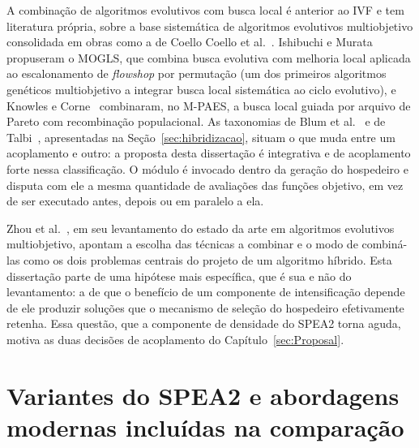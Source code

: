 A combinação de algoritmos evolutivos com busca local é anterior ao IVF e tem literatura própria, sobre a base sistemática de algoritmos evolutivos multiobjetivo consolidada em obras como a de Coello Coello et al.~\cite{coello2007evolutionary}. Ishibuchi e Murata~\cite{ishibuchi1998multi} propuseram o MOGLS, que combina busca evolutiva com melhoria local aplicada ao escalonamento de \textit{flowshop} por permutação (um dos primeiros algoritmos genéticos multiobjetivo a integrar busca local sistemática ao ciclo evolutivo), e Knowles e Corne~\cite{knowles2000memetic} combinaram, no M-PAES, a busca local guiada por arquivo de Pareto com recombinação populacional. As taxonomias de Blum et al.~\cite{blum2011hybrid} e de Talbi~\cite{talbi2009metaheuristics}, apresentadas na Seção~\ref{sec:hibridizacao}, situam o que muda entre um acoplamento e outro: a proposta desta dissertação é integrativa e de acoplamento forte nessa classificação. O módulo é invocado dentro da geração do hospedeiro e disputa com ele a mesma quantidade de avaliações das funções objetivo, em vez de ser executado antes, depois ou em paralelo a ela.

Zhou et al.~\cite{zhou2011multiobjective}, em seu levantamento do estado da arte em algoritmos evolutivos multiobjetivo, apontam a escolha das técnicas a combinar e o modo de combiná-las como os dois problemas centrais do projeto de um algoritmo híbrido. Esta dissertação parte de uma hipótese mais específica, que é sua e não do levantamento: a de que o benefício de um componente de intensificação depende de ele produzir soluções que o mecanismo de seleção do hospedeiro efetivamente retenha. Essa questão, que a componente de densidade do SPEA2 torna aguda, motiva as duas decisões de acoplamento do Capítulo~\ref{sec:Proposal}.

\section{Variantes do SPEA2 e abordagens modernas incluídas na comparação}
\label{sec:rw_variantes}

